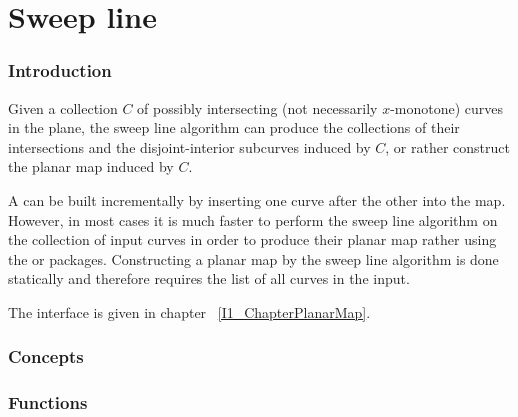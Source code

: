 \chapter{Sweep line}

\subsection*{Introduction}

Given a collection $C$ of possibly intersecting 
(not necessarily $x$-monotone) curves in the plane, 
the sweep line algorithm can produce the collections of their 
intersections and the disjoint-interior subcurves induced by $C$, or rather 
construct the planar map induced by $C$.

A  can be built incrementally by
inserting one curve after the other into the map. 
However, in most cases it is much faster to perform the sweep line algorithm on
the collection of input curves in order to produce their planar map 
rather using the  
or  packages.
Constructing a planar map by the sweep line algorithm is done statically and
therefore requires the list of all curves in the input.



The interface is given in chapter ~\ref{I1_ChapterPlanarMap}.

\begin{ccTexOnly}

\subsection*{Concepts}

\subsection*{Functions}
\\
\\
\\

\end{ccTexOnly}    


